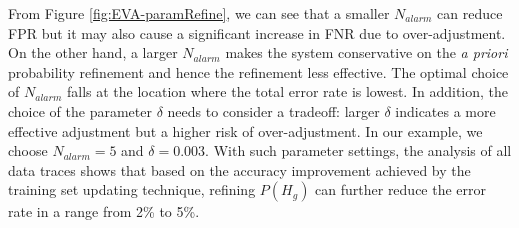From Figure \ref{fig:EVA-paramRefine}, we can see that a smaller $N_{alarm}$ can reduce FPR but it may also cause a significant increase in FNR due to over-adjustment. On the other hand, a larger $N_{alarm}$ makes the system conservative on the \textit{a priori} probability refinement and hence the refinement less effective. The optimal choice of  $N_{alarm}$ falls at the location where the total error rate is lowest. In addition, the choice of the parameter $\delta$ needs to consider a tradeoff: larger $\delta$ indicates a more effective adjustment but a higher risk of over-adjustment. In our example, we choose $N_{alarm} = 5$ and $\delta = 0.003$. With such parameter settings, the analysis of all data traces shows that based on the accuracy improvement achieved by the training set updating technique, refining $P(H_g)$  can further reduce the error rate in a range from 2\% to 5\%. 




